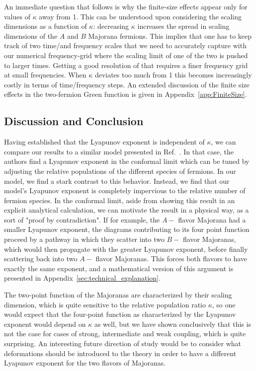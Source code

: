 An immediate question that follows is why the finite-size effects appear only for values of $\kappa$ away from 1. This can be understood upon considering the scaling dimensions as a function of $\kappa$: decreasing $\kappa$ increases the spread in scaling dimensions of the $A$ and $B$ Majorana fermions.
This implies that one has to keep track  of two time/and frequency scales that we need to accurately capture with our numerical frequency-grid where the scaling limit of one of the two is pushed to larger times. Getting a good resolution of that requires a finer frequency grid at small frequencies.
When $\kappa$ deviates too much from 1 this becomes increasingly costly in terms of time/frequency steps. An extended discussion of the finite size effects in the two-fermion Green function is given in Appendix~\ref{app:FiniteSize}.


\subsection{Discussion and Conclusion}


Having established that the Lyapunov exponent is independent of $\kappa$, 
we can compare our results to a similar model presented in Ref.~\cite{chen2017tunable}.
In that case, the authors find a Lyapunov exponent in the conformal limit which can be tuned by adjusting the relative populations of the different species of fermions. In our model, we find a stark contrast to this behavior.
Instead, we find that our model's Lyapunov exponent is completely impervious to the relative number of fermion species. In the conformal limit,
aside from showing this result in an explicit analytical calculation,
we can motivate the result in a physical way, as a sort of "proof by contradiction".
If for example, the $A- $ flavor Majorana had a smaller Lyapunov exponent,
the diagrams contributing to its four point function proceed by a pathway in which they scatter into two $B- $ flavor Majoranas,
which would then propagate with the greater Lyapunov exponent,
before finally scattering back into two $A- $ flavor Majoranas. This forces both flavors to have exactly the same exponent,
and a mathematical version of this argument is presented in Appendix~\ref{sec:technical_explanation}.  


The two-point function of the Majoranas are characterized by their scaling dimension,
which is quite sensitive to the relative population ratio $\kappa$,
so one would expect that the four-point function as characterized by the Lyapunov exponent would depend on $\kappa$ as well,
but we have shown conclusively that this is not the case for cases of strong, intermediate and weak coupling, which is quite surprising.
An interesting future direction of study would be to consider what deformations should be introduced to the theory in order to have a different Lyapunov exponent for the two flavors of Majoranas.

